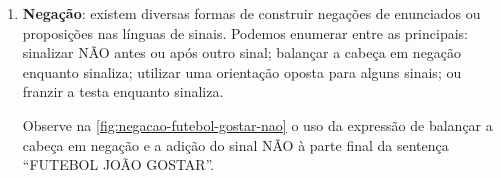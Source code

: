 \begin{enumerate}
\begin{enumerate}
                    {capitulos/fundamentacao/imagens/topicalizada_futebol_gostar} %
                    {height=3cm} %
                    {Frase topicalizada ``FUTEBOL JOÃO GOSTAR''} %
                    {quadros-2004-estudos-linguisticos} %


          \end{enumerate}


    \item \textbf{Negação}: existem diversas formas de construir negações de enunciados ou proposições nas línguas de sinais. Podemos enumerar entre as principais: sinalizar NÃO antes ou após outro sinal; balançar a cabeça em negação enquanto sinaliza; utilizar uma orientação oposta para alguns sinais; ou franzir a testa enquanto sinaliza.

          Observe na \autoref{fig:negacao-futebol-gostar-nao} o uso da expressão de balançar a cabeça em negação e a adição do sinal NÃO à parte final da sentença ``FUTEBOL JOÃO GOSTAR''.





\end{enumerate}
